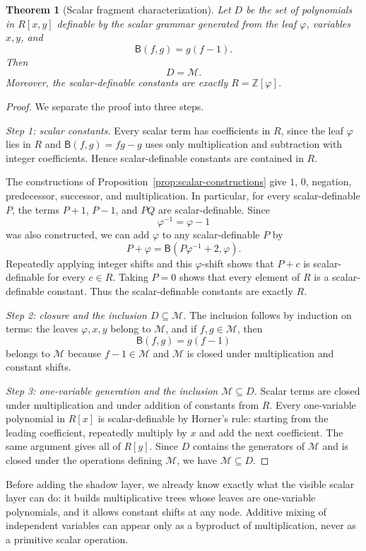 \documentclass[11pt]{article}
\newtheorem{theorem}[definition]{Theorem}
\newcommand{\B}{\mathsf{B}}
\newcommand{\ph}{\varphi}
\newcommand{\Z}{\mathbb{Z}}
\begin{document}
\begin{theorem}[Scalar fragment characterization]\label{thm:scalar-characterization}
Let $D$ be the set of polynomials in $R[x,y]$ definable by the scalar grammar generated from the leaf $\ph$, variables $x,y$, and
\[
    \B(f,g)=g(f-1).
\]
Then
\[
    D=\mathcal M.
\]
Moreover, the scalar-definable constants are exactly $R=\Z[\ph]$.
\end{theorem}

\begin{proof}
We separate the proof into three steps.

\emph{Step 1: scalar constants.}  Every scalar term has coefficients in $R$, since the leaf $\ph$ lies in $R$ and $\B(f,g)=fg-g$ uses only multiplication and subtraction with integer coefficients.  Hence scalar-definable constants are contained in $R$.

The constructions of Proposition~\ref{prop:scalar-constructions} give $1$, $0$, negation, predecessor, successor, and multiplication.  In particular, for every scalar-definable $P$, the terms $P+1$, $P-1$, and $PQ$ are scalar-definable.  Since
\[
    \ph^{-1}=\ph-1
\]
was also constructed, we can add $\ph$ to any scalar-definable $P$ by
\[
    P+\ph=\B(P\ph^{-1}+2,\ph).
\]
Repeatedly applying integer shifts and this $\ph$-shift shows that $P+c$ is scalar-definable for every $c\in R$.  Taking $P=0$ shows that every element of $R$ is a scalar-definable constant.  Thus the scalar-definable constants are exactly $R$.

\emph{Step 2: closure and the inclusion $D\subseteq\mathcal M$.}  The inclusion follows by induction on terms: the leaves $\ph,x,y$ belong to $\mathcal M$, and if $f,g\in\mathcal M$, then
\[
    \B(f,g)=g(f-1)
\]
belongs to $\mathcal M$ because $f-1\in\mathcal M$ and $\mathcal M$ is closed under multiplication and constant shifts.

\emph{Step 3: one-variable generation and the inclusion $\mathcal M\subseteq D$.}  Scalar terms are closed under multiplication and under addition of constants from $R$.  Every one-variable polynomial in $R[x]$ is scalar-definable by Horner's rule: starting from the leading coefficient, repeatedly multiply by $x$ and add the next coefficient.  The same argument gives all of $R[y]$.  Since $D$ contains the generators of $\mathcal M$ and is closed under the operations defining $\mathcal M$, we have $\mathcal M\subseteq D$.
\end{proof}

Before adding the shadow layer, we already know exactly what the visible scalar layer can do: it builds multiplicative trees whose leaves are one-variable polynomials, and it allows constant shifts at any node.  Additive mixing of independent variables can appear only as a byproduct of multiplication, never as a primitive scalar operation.
\end{document}
